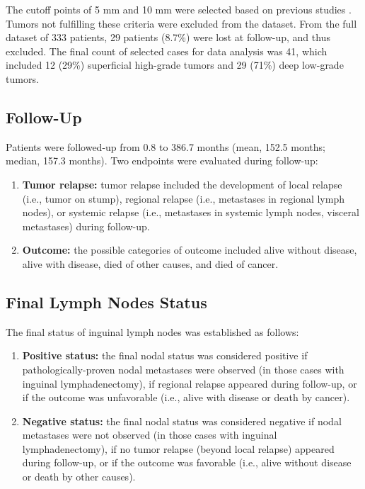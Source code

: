 \documentclass[11pt,letterpaper]{article}\usepackage[]{graphicx}\usepackage[]{color}
\begin{document}
\begin{multicols}{2}
The cutoff points of 5 mm and 10 mm were selected based on previous studies \cite{Velazquez2008}. Tumors not fulfilling these criteria were excluded from the dataset. From the full dataset of 333 patients, 29 patients (8.7\%) were lost at follow-up, and thus excluded. The final count of selected cases for data analysis was 41, which included 12 (29\%) superficial high-grade tumors and 29 (71\%) deep low-grade tumors.

\subsection*{Follow-Up}
Patients were followed-up from 0.8 to 386.7 months (mean, 152.5 months; median, 157.3 months). Two endpoints were evaluated during follow-up:
\begin{enumerate}
        \item \textbf{Tumor relapse:} tumor relapse included the development of local relapse (i.e., tumor on stump), regional relapse (i.e., metastases in regional lymph nodes), or systemic relapse (i.e., metastases in systemic lymph nodes, visceral metastases) during follow-up.
        \item \textbf{Outcome:} the possible categories of outcome included alive without disease, alive with disease, died of other causes, and died of cancer.
\end{enumerate}

\subsection*{Final Lymph Nodes Status}
The final status of inguinal lymph nodes was established as follows: 
\begin{enumerate}
        \item \textbf{Positive status:} the final nodal status was considered positive if pathologically-proven nodal metastases were observed (in those cases with inguinal lymphadenectomy), if regional relapse appeared during follow-up, or if the outcome was unfavorable (i.e., alive with disease or death by cancer).
        \item \textbf{Negative status:} the final nodal status was considered negative if nodal metastases were not observed (in those cases with inguinal lymphadenectomy), if no tumor relapse (beyond local relapse) appeared during follow-up, or if the outcome was favorable (i.e., alive without disease or death by other causes).
\end{enumerate}


\end{multicols}
\end{document}
